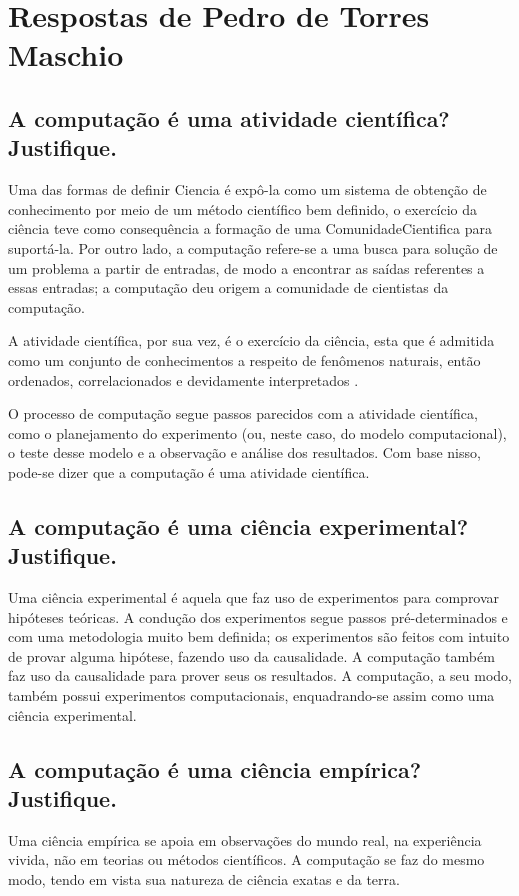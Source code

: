 \section{Respostas de Pedro de Torres Maschio}



\subsection{A computação é uma atividade científica? Justifique. }

Uma das formas de definir \gls{Ciencia} é expô-la como um sistema de obtenção de conhecimento por meio de um método científico  bem definido, o exercício da ciência teve como consequência a formação de uma \gls{ComunidadeCientifica} para suportá-la. Por outro lado, a computação refere-se a uma busca para solução de um problema a partir de entradas, de modo a encontrar as saídas referentes a essas entradas; a computação deu origem a comunidade de cientistas da computação.

A atividade científica, por sua vez, é o exercício da ciência, esta que é admitida como um conjunto de conhecimentos a respeito de fenômenos naturais, então ordenados, correlacionados e devidamente interpretados
\cite{decourt_atividade_nodate}.

O processo de computação segue passos parecidos com a atividade científica, como o \gls{planejamento} do experimento (ou, neste caso, do modelo computacional), o teste desse modelo e a observação e análise dos resultados. Com base nisso, pode-se dizer que a computação é uma atividade científica.

\subsection{A computação é uma ciência experimental? Justifique. }

Uma ciência experimental é aquela que faz uso de experimentos para comprovar hipóteses teóricas. A condução dos experimentos segue passos pré-determinados e com uma metodologia muito bem definida; os experimentos são feitos com intuito de provar alguma hipótese, fazendo uso da causalidade. A computação também faz uso da causalidade para prover seus os resultados. A computação, a seu modo, também possui experimentos computacionais, enquadrando-se assim como uma ciência experimental.

\subsection{A computação é uma ciência empírica? Justifique. }

Uma ciência empírica se apoia em observações do mundo real, na experiência vivida, não em teorias ou métodos científicos. A computação se faz do mesmo modo, tendo em vista sua natureza de ciência exatas e da terra.